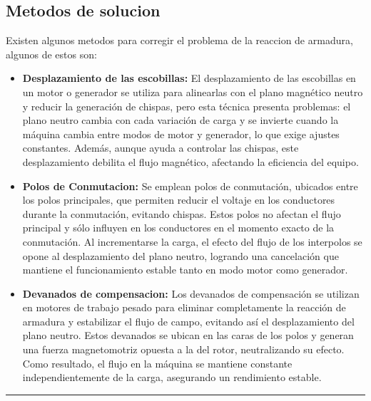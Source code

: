 \documentclass[
  11pt,
  letterpaper,
   addpoints,
   answers
  ]{exam}
\begin{document}
\subsection*{Metodos de solucion}
Existen algunos metodos para corregir el problema de la reaccion de armadura, algunos de estos son:
\begin{itemize}
  \item \textbf{Desplazamiento de las escobillas:} El desplazamiento de las escobillas en un motor o generador se utiliza para alinearlas con el plano magnético neutro y reducir la generación de chispas, pero esta técnica presenta problemas: el plano neutro cambia con cada variación de carga y se invierte cuando la máquina cambia entre modos de motor y generador, lo que exige ajustes constantes. Además, aunque ayuda a controlar las chispas, este desplazamiento debilita el flujo magnético, afectando la eficiencia del equipo.
  \item \textbf{Polos de Conmutacion:} Se emplean polos de conmutación, ubicados entre los polos principales, que permiten reducir el voltaje en los conductores durante la conmutación, evitando chispas. Estos polos no afectan el flujo principal y sólo influyen en los conductores en el momento exacto de la conmutación. Al incrementarse la carga, el efecto del flujo de los interpolos se opone al desplazamiento del plano neutro, logrando una cancelación que mantiene el funcionamiento estable tanto en modo motor como generador.
  \item \textbf{Devanados de compensacion:} Los devanados de compensación se utilizan en motores de trabajo pesado para eliminar completamente la reacción de armadura y estabilizar el flujo de campo, evitando así el desplazamiento del plano neutro. Estos devanados se ubican en las caras de los polos y generan una fuerza magnetomotriz opuesta a la del rotor, neutralizando su efecto. Como resultado, el flujo en la máquina se mantiene constante independientemente de la carga, asegurando un rendimiento estable.
\end{itemize}
\newpage
\hrule
\end{document}
